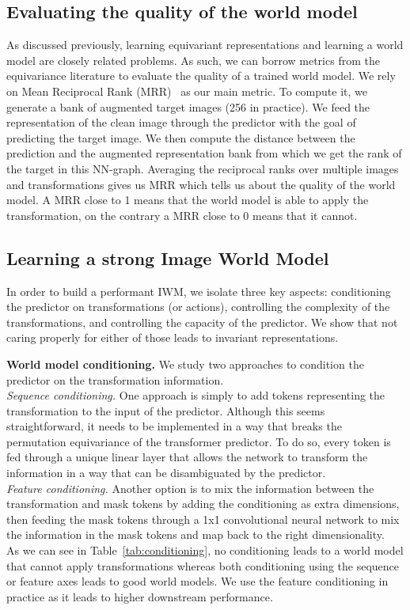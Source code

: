 \documentclass[twocolumn]{fairmeta}
\theoremstyle{plain}
\theoremstyle{definition}
\theoremstyle{remark}
\begin{document}
\subsection{Evaluating the quality of the world model}

As discussed previously, learning equivariant representations and learning a world model are closely related problems. As such, we can borrow metrics from the equivariance literature to evaluate the quality of a trained world model. We rely on Mean Reciprocal Rank (MRR)~\citep{kipf2019contrastive} as our main metric. To compute it, we generate a bank of augmented target images (256 in practice). We feed the representation of the clean image through the predictor with the goal of predicting the target image. We then compute the distance between the prediction and the augmented representation bank from which we get the rank of the target in this NN-graph. Averaging the reciprocal ranks over multiple images and transformations gives us MRR which tells us about the quality of the world model. A MRR close to 1 means that the world model is able to apply the transformation, on the contrary a MRR close to 0 means that it cannot. 

\subsection{Learning a strong Image World Model}

In order to build a performant IWM, we isolate three key aspects: conditioning the predictor on transformations (or actions), controlling the complexity of the transformations, and controlling the capacity of the predictor. We show that not caring properly for either of those leads to invariant representations.

\textbf{World model conditioning.} We study two approaches to condition the predictor on the transformation information. \\
\textit{Sequence conditioning.} One approach is simply to add tokens representing the transformation to the input of the predictor. Although this seems straightforward, it needs to be implemented in a way that breaks the permutation equivariance of the transformer predictor. To do so, every token is fed through a unique linear layer that allows the network to transform the information in a way that can be disambiguated by the predictor. \\
\textit{Feature conditioning.} Another option is to mix the information between the transformation and mask tokens by adding the conditioning as extra dimensions, then feeding the mask tokens through a 1x1 convolutional neural network to mix the information in the mask tokens and map back to the right dimensionality. \\
As we can see in Table~\ref{tab:conditioning}, no conditioning leads to a world model that cannot apply transformations whereas both conditioning using the sequence or feature axes leads to good world models. We use the feature conditioning in practice as it leads to higher downstream performance.
\end{document}
